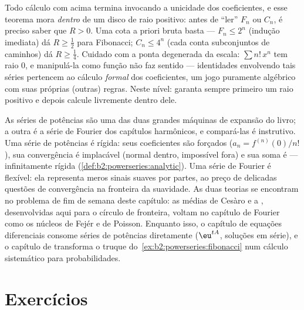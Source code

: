 \begin{remark}
Todo cálculo com  acima termina invocando
a unicidade dos coeficientes, e esse teorema mora
\emph{dentro} de um disco de raio positivo: antes de ``ler''
$F_n$ ou $C_n$, é preciso saber que $R > 0$. Uma cota a priori bruta
basta --- $F_n \leq 2^n$ (indução imediata) dá $R \geq
\frac12$ para Fibonacci; $C_n \leq 4^n$ (cada 
conta subconjuntos de caminhos) dá $R \geq \frac14$. Cuidado com a
ponta degenerada da escala: $\sum n!\,x^n$ tem raio $0$, e
manipulá-la como função não faz sentido --- identidades
envolvendo tais séries pertencem ao cálculo \emph{formal} dos
coeficientes, um jogo puramente algébrico com suas próprias (outras)
regras. Neste nível: garanta sempre primeiro um raio positivo e
depois calcule livremente dentro dele.
\end{remark}

\begin{remark}
As séries de potências são uma das duas grandes máquinas de expansão
do livro; a outra é a série de Fourier dos capítulos harmônicos,
e compará-las é instrutivo. Uma série de potências é
rígida: seus coeficientes são forçados ($a_n = f^{(n)}(0)/n!$),
sua convergência é implacável (normal dentro, impossível fora)
e sua soma é  --- infinitamente rígida
(\cref{def:b2:powerseries:analytic}). Uma série de Fourier é
flexível: ela representa meros sinais suaves por partes, ao
preço de delicadas questões de convergência na fronteira da
suavidade. As duas teorias se encontram no problema de fim de semana
deste capítulo: as médias de Cesàro e a , desenvolvidas aqui para
o círculo de fronteira, voltam no capítulo de Fourier como os núcleos de
Fejér e de Poisson. Enquanto isso, o capítulo de equações diferenciais
consome séries de potências diretamente ($\eu^{tA}$, soluções
em série), e o capítulo de  transforma
o truque do~\cref{ex:b2:powerseries:fibonacci} num cálculo sistemático
para probabilidades.
\end{remark}

\section{Exercícios}

